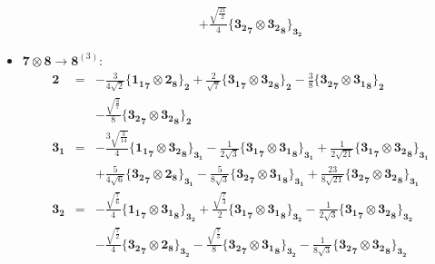 \documentclass[english]{article}
\newcommand{\subcg}[3]{\big\{ {#1}\otimes{#2}\big\}^{}_{#3}}
\newcommand{\rep}[1]{\mathbf{#1}}
\begin{document}
\begin{itemize}
\begin{eqnarray*}
 & & +\frac{\sqrt{\frac{21}{2}}}{4}\subcg{\rep{3_2}_{\rep{7}}}{\rep{3_2}_{\rep{8}}}{\rep{3_2}}
\end{eqnarray*}
\item $\rep{7}\otimes\rep{8}\to\rep{8}^{(3)}$:
\begin{eqnarray*}
\rep{2} &=& -\frac{3}{4 \sqrt{2}}\subcg{\rep{1_1}_{\rep{7}}}{\rep{2}_{\rep{8}}}{\rep{2}}+\frac{2}{\sqrt{7}}\subcg{\rep{3_1}_{\rep{7}}}{\rep{3_2}_{\rep{8}}}{\rep{2}}-\frac{3}{8}\subcg{\rep{3_2}_{\rep{7}}}{\rep{3_1}_{\rep{8}}}{\rep{2}} \\ 
 & & -\frac{\sqrt{\frac{3}{7}}}{8}\subcg{\rep{3_2}_{\rep{7}}}{\rep{3_2}_{\rep{8}}}{\rep{2}}
\\
\rep{3_1} &=& -\frac{3 \sqrt{\frac{3}{14}}}{4}\subcg{\rep{1_1}_{\rep{7}}}{\rep{3_2}_{\rep{8}}}{\rep{3_1}}-\frac{1}{2 \sqrt{3}}\subcg{\rep{3_1}_{\rep{7}}}{\rep{3_1}_{\rep{8}}}{\rep{3_1}}+\frac{1}{2 \sqrt{21}}\subcg{\rep{3_1}_{\rep{7}}}{\rep{3_2}_{\rep{8}}}{\rep{3_1}} \\ 
 & & +\frac{5}{4 \sqrt{6}}\subcg{\rep{3_2}_{\rep{7}}}{\rep{2}_{\rep{8}}}{\rep{3_1}}-\frac{5}{8 \sqrt{3}}\subcg{\rep{3_2}_{\rep{7}}}{\rep{3_1}_{\rep{8}}}{\rep{3_1}}+\frac{23}{8 \sqrt{21}}\subcg{\rep{3_2}_{\rep{7}}}{\rep{3_2}_{\rep{8}}}{\rep{3_1}}
\\
\rep{3_2} &=& -\frac{\sqrt{\frac{7}{6}}}{4}\subcg{\rep{1_1}_{\rep{7}}}{\rep{3_1}_{\rep{8}}}{\rep{3_2}}+\frac{\sqrt{\frac{7}{3}}}{2}\subcg{\rep{3_1}_{\rep{7}}}{\rep{3_1}_{\rep{8}}}{\rep{3_2}}-\frac{1}{2 \sqrt{3}}\subcg{\rep{3_1}_{\rep{7}}}{\rep{3_2}_{\rep{8}}}{\rep{3_2}} \\ 
 & & -\frac{\sqrt{\frac{7}{2}}}{4}\subcg{\rep{3_2}_{\rep{7}}}{\rep{2}_{\rep{8}}}{\rep{3_2}}-\frac{\sqrt{\frac{7}{3}}}{8}\subcg{\rep{3_2}_{\rep{7}}}{\rep{3_1}_{\rep{8}}}{\rep{3_2}}-\frac{1}{8 \sqrt{3}}\subcg{\rep{3_2}_{\rep{7}}}{\rep{3_2}_{\rep{8}}}{\rep{3_2}}
\end{eqnarray*}
\end{itemize}
\end{document}
